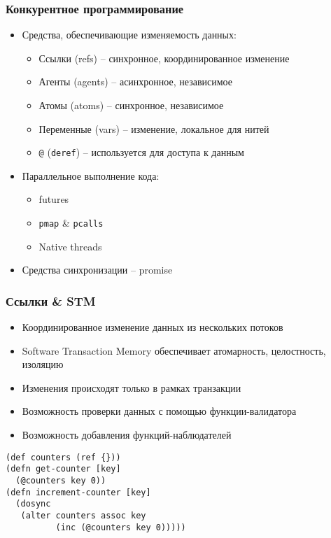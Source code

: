 \documentclass[ignorenonframetext]{beamer}
\begin{document}
\begin{frame}[t,fragile]
  \frametitle{Конкурентное программирование}
  \begin{itemize}
  \item Средства, обеспечивающие изменяемость данных:
    \begin{itemize}
    \item Ссылки (refs) -- синхронное, координированное изменение
    \item Агенты (agents) -- асинхронное, независимое
    \item Атомы (atoms) -- синхронное, независимое
    \item Переменные (vars) -- изменение, локальное для нитей
    \item \lstinline|@| (\texttt{deref}) -- используется для доступа к данным
    \end{itemize}
  \item Параллельное выполнение кода:
    \begin{itemize}
    \item futures
    \item \texttt{pmap} \& \texttt{pcalls}
    \item Native threads
    \end{itemize}
  \item Средства синхронизации -- promise
  \end{itemize}
\end{frame}


\begin{frame}[fragile,t]
  \frametitle{Ссылки \& STM}
  \begin{itemize}
  \item Координированное изменение данных из нескольких потоков
  \item Software Transaction Memory обеспечивает атомарность, целостность, изоляцию
  \item Изменения происходят только в рамках транзакции
  \item Возможность проверки данных с помощью функции-валидатора
  \item Возможность добавления функций-наблюдателей
  \end{itemize}
\begin{lstlisting}
(def counters (ref {}))
(defn get-counter [key]
  (@counters key 0))
(defn increment-counter [key]
  (dosync
   (alter counters assoc key 
          (inc (@counters key 0)))))
\end{lstlisting}
\end{frame}
\end{document}
